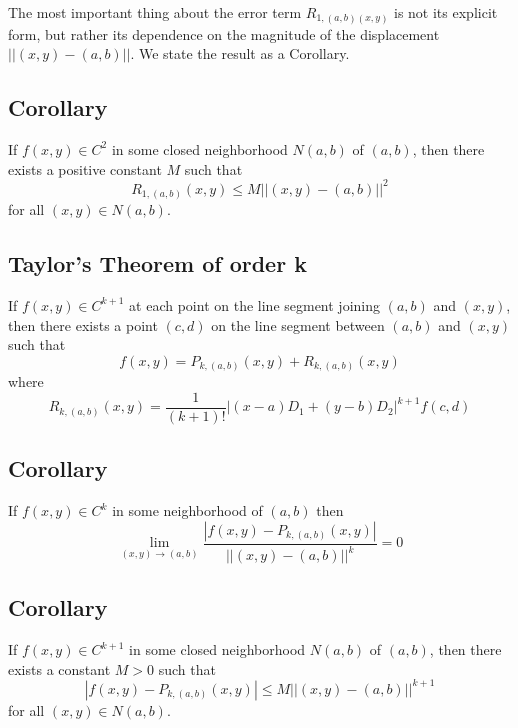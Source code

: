 \begin{remark}
    The most important thing about the error term $ R_{1,(a,b)(x,y)} $ is not
    its explicit form, but rather its dependence on the magnitude of the 
    displacement $ ||(x,y)−(a,b)|| $. We state the result as a Corollary.
\end{remark}

\begin{thmbox}
\subsection{Corollary}
If $ f(x,y)\in C^2 $ in some closed neighborhood
$ N(a,b) $ of $ (a,b) $, then there exists a positive constant
$ M $ such that
\[ R_{1,(a,b)}(x,y)\le M||(x,y)-(a,b)||^2 \]
for all $ (x,y)\in N(a,b) $.
\end{thmbox}

\begin{thmbox}
\subsection{Taylor's Theorem of order k}
If $ f(x,y)\in C^{k+1} $ at each point on the line segment
joining $ (a,b) $ and $ (x,y) $, then there exists
a point $ (c,d) $ on the line segment between $ (a,b) $ and
$ (x,y) $ such that
\[ f(x,y)=P_{k,(a,b)}(x,y)+R_{k,(a,b)}(x,y) \]
where
\[ R_{k,(a,b)}(x,y)=\frac{1}{(k+1)!}
    |(x-a)D_1+(y-b)D_2|^{k+1}f(c,d)\]
\end{thmbox}

\begin{thmbox}
\subsection{Corollary}
If $ f(x,y)\in C^k $ in some neighborhood of
$ (a,b) $ then
\[ \lim\limits_{{(x,y)} \to {(a,b)}} 
\frac{|f(x,y)-P_{k,(a,b)}(x,y)|}{||(x,y)-(a,b)||^k}=0  \]
\end{thmbox}

\begin{thmbox}
\subsection{Corollary}
If $ f(x,y)\in C^{k+1} $ in some closed neighborhood
$ N(a,b) $ of $ (a,b) $, then there exists a constant
$ M>0 $ such that
\[ |f(x,y)-P_{k,(a,b)}(x,y)|\le M||(x,y)-(a,b)||^{k+1} \]
for all $ (x,y)\in N(a,b) $.
\end{thmbox}